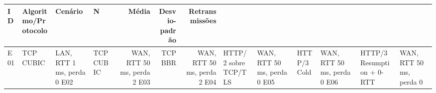 \begin{tabular}{llllrrr}
\hline
ID & Algoritmo/Protocolo & Cenário & N & Média & Desvio-padrão & Retransmissões \\
\hline
E01 & TCP CUBIC & LAN, RTT 1 ms, perda 0%
E02 & TCP CUBIC & WAN, RTT 50 ms, perda 2%
E03 & TCP BBR & WAN, RTT 50 ms, perda 2%
E04 & HTTP/2 sobre TCP/TLS & WAN, RTT 50 ms, perda 0%
E05 & HTTP/3 Cold & WAN, RTT 50 ms, perda 0%
E06 & HTTP/3 Resumption + 0-RTT & WAN, RTT 50 ms, perda 0%
\hline
\end{tabular}
